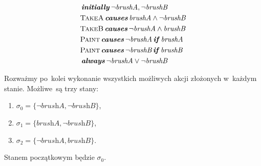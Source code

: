 \documentclass[11pt,a4paper]{article}
\DeclareMathOperator{\Initially}{\textbf{\textit{initially}}}
\DeclareMathOperator{\Causes}{\textbf{\textit{causes}}}
\DeclareMathOperator{\If}{\textbf{\textit{if}}}
\DeclareMathOperator{\Always}{\textbf{\textit{always}}}
\begin{document}
\begin{align*}
    & \Initially  \neg \textit{brushA}, \neg \textit{brushB} \\
	& \textsc{TakeA} \Causes \textit{brushA} \land \neg \textit{brushB}  \\
	& \textsc{TakeB} \Causes \neg \textit{brushA} \land \textit{brushB}  \\
	& \textsc{Paint} \Causes \neg \textit{brushA} \If \textit{brushA} \\
	& \textsc{Paint} \Causes \neg \textit{brushB} \If \textit{brushB} \\
	& \Always \neg \textit{brushA} \lor \neg \textit{brushB}
\end{align*}

Rozważmy po~kolei wykonanie wszystkich możliwych akcji złożonych w~każdym stanie. Możliwe~są trzy stany:

\begin{enumerate}
    \item $\sigma_0 = \{ \neg \textit{brushA}, \neg \textit{brushB} \}$,
    \item $\sigma_1 = \{ \textit{brushA}, \neg \textit{brushB} \}$,
    \item $\sigma_2 = \{ \neg \textit{brushA}, \textit{brushB} \}$.
\end{enumerate}

Stanem początkowym będzie $\sigma_0$.
\end{document}
